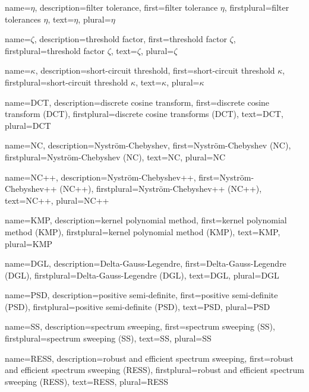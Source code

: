 {%
  name={$\eta$},%
  description={filter tolerance},%
  first={filter tolerance $\eta$},%
  firstplural={filter tolerances $\eta$},%
  text={$\eta$},%
  plural={$\eta$}%
}

{%
  name={$\zeta$},%
  description={threshold factor},%
  first={threshold factor $\zeta$},%
  firstplural={threshold factor $\zeta$},%
  text={$\zeta$},%
  plural={$\zeta$}%
}

{%
  name={$\kappa$},%
  description={short-circuit threshold},%
  first={short-circuit threshold $\kappa$},%
  firstplural={short-circuit threshold $\kappa$},%
  text={$\kappa$},%
  plural={$\kappa$}%
}

{%
  name={DCT},%
  description={discrete cosine transform},%
  first={discrete cosine transform (DCT)},%
  firstplural={discrete cosine transforms (DCT)},%
  text={DCT},%
  plural={DCT}%
}

{%
  name={NC},%
  description={Nystr\"om-Chebyshev},%
  first={Nystr\"om-Chebyshev (NC)},%
  firstplural={Nystr\"om-Chebyshev (NC)},%
  text={NC},%
  plural={NC}%
}

{%
  name={NC++},%
  description={Nystr\"om-Chebyshev++},%
  first={Nystr\"om-Chebyshev++ (NC++)},%
  firstplural={Nystr\"om-Chebyshev++ (NC++)},%
  text={NC++},%
  plural={NC++}%
}

{%
  name={KMP},%
  description={kernel polynomial method},%
  first={kernel polynomial method (KMP)},%
  firstplural={kernel polynomial method (KMP)},%
  text={KMP},%
  plural={KMP}%
}

%
{%
  name={DGL},%
  description={Delta-Gauss-Legendre},%
  first={Delta-Gauss-Legendre (DGL)},%
  firstplural={Delta-Gauss-Legendre (DGL)},%
  text={DGL},%
  plural={DGL}%
}

%
{%
  name={PSD},%
  description={positive semi-definite},%
  first={positive semi-definite (PSD)},%
  firstplural={positive semi-definite (PSD)},%
  text={PSD},%
  plural={PSD}%
}

%
{%
  name={SS},%
  description={spectrum sweeping},%
  first={spectrum sweeping (SS)},%
  firstplural={spectrum sweeping (SS)},%
  text={SS},%
  plural={SS}%
}

%
{%
  name={RESS},%
  description={robust and efficient spectrum sweeping},%
  first={robust and efficient spectrum sweeping (RESS)},%
  firstplural={robust and efficient spectrum sweeping (RESS)},%
  text={RESS},%
  plural={RESS}%
}
